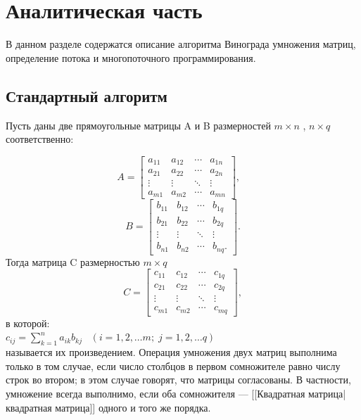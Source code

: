 \documentclass[a4paper,12pt]{report}
\begin{document}
\chapter{Аналитическая часть}
\hspace{0.6cm}В данном разделе содержатся описание алгоритма Винограда умножения матриц, определение потока и многопоточного программирования.

\section{Стандартный алгоритм}
\hspace{0.6cm}Пусть даны две прямоугольные матрицы A и B размерностей $m \times n$ , $n \times q$ соответственно:

\[
A = 
  \begin{bmatrix} 
    a_{11} & a_{12} & \cdots & a_{1n} \\
    a_{21} & a_{22} & \cdots & a_{2n} \\ 
    \vdots & \vdots & \ddots & \vdots \\ 
    a_{m1} & a_{m2} & \cdots & a_{mn}
  \end{bmatrix},\;\;\;
\]
\[
B =   
  \begin{bmatrix} 
    b_{11} & b_{12} & \cdots & b_{1q} \\
    b_{21} & b_{22} & \cdots & b_{2q} \\ 
    \vdots & \vdots & \ddots & \vdots \\ 
    b_{n1} & b_{n2} & \cdots & b_{nq}.
  \end{bmatrix}.
\]
Тогда матрица C размерностью $m \times q$
\[
C = 
  \begin{bmatrix} 
    c_{11} & c_{12} & \cdots & c_{1q} \\
    c_{21} & c_{22} & \cdots & c_{2q} \\ 
    \vdots & \vdots & \ddots & \vdots \\ 
    c_{m1} & c_{m2} & \cdots & c_{mq}
  \end{bmatrix},
\]
в которой:\\

$c_{ij} = \sum_{k=1}^n a_{ik}b_{kj} \;\;\; \left(i=1, 2, \ldots m;\; j=1, 2, \ldots q \right)$\\

называется их произведением. Операция умножения двух матриц выполнима только в том случае, если число столбцов в первом сомножителе равно числу строк во втором; в этом случае говорят, что матрицы согласованы. В частности, умножение всегда выполнимо, если оба сомножителя — [[Квадратная матрица|квадратная матрица]] одного и того же порядка. 
\end{document}
